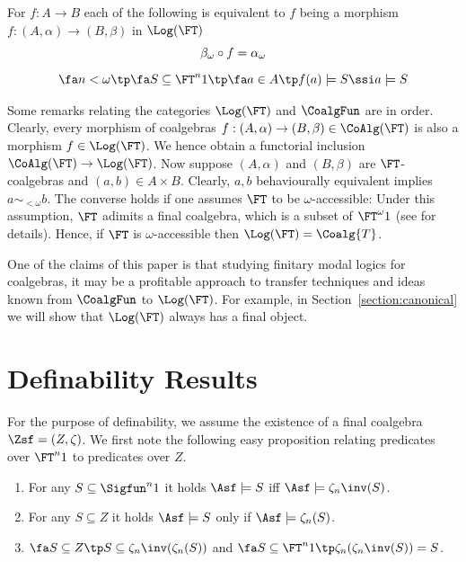 \documentclass{entcs}
\begin{document}
\begin{remark} 
  For $f:A\to B$ each of the following is equivalent to $f$ being a
  morphism $f:(A,\alpha)\to (B,\beta)$ in $\Log(\FT)$
\begin{gather*}
  \beta_\omega\circ f = \alpha_\omega\medskip\\
  \fa n<\omega\tp \fa S\subseteq \FT^n1\tp\fa a\in A \tp f(a)\models S
  \ssi a\models S
\end{gather*}
\end{remark}

\begin{remark}
  Some remarks relating the categories $\Log(\FT)$ and $\CoalgFun$ are
  in order. Clearly, every morphism of coalgebras $f: (A, \alpha) \to
  (B, \beta) \in \CoAlg(\FT)$ is also a morphism $f \in \Log(\FT)$. We
  hence obtain a functorial inclusion $\CoAlg(\FT) \to \Log(\FT)$. Now
  suppose $(A, \alpha)$ and $(B, \beta)$ are $\FT$-coalgebras and $(a,
  b) \in A \times B$. 
  Clearly, $a, b$ behaviourally equivalent implies $a \sim_{<\omega}
  b$. The converse holds if one assumes $\FT$ to be
  $\omega$-accessible:  Under this assumption, $\FT$ adimits a final
  coalgebra, which is a subset of $\FT^{\omega} 1$ (see
  \cite{worrell:cmcs99} for details). Hence, if $\FT$ is
  $\omega$-accessible then $\Log(\FT)=\Coalg{T}$.
\end{remark}

One of the claims of this paper is that studying finitary modal logics
for coalgebras, it may be a profitable approach to transfer techniques
and ideas known from $\CoalgFun$ to $\Log(\FT)$. For example, in
Section~\ref{section:canonical} we will show that $\Log(\FT)$
always has a final object.




\section{Definability Results}\label{section:definability}

For the purpose of definability, we assume the existence of a final coalgebra
$\Zsf = (Z, \zeta)$.
We
first note the following easy proposition relating predicates
over $\FT^n1$ to predicates over $Z$.

\begin{prop}\label{prop:fin}\label{prop:app}\label{prop:finapp}
\begin{enumerate}
\item  For any $S\subseteq \Sigfun^n 1$ it holds $\Asf\models S$
  iff $\Asf\models\zeta_n\inv(S)$.
\item  For any $S\subseteq Z$ it holds $\Asf\models S$ only if
  $\Asf\models\zeta_n(S)$.
\item  $\fa S\subseteq Z \tp S \subseteq \zeta_n\inv(\zeta_n(S))$ and
  $\fa S\subseteq\FT^n 1\tp\zeta_n(\zeta_n\inv(S))=S$.
\end{enumerate}
\end{prop}
\end{document}
